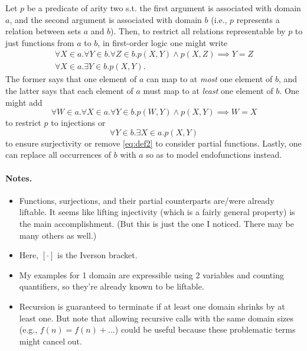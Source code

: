Let $p$ be a predicate of arity two s.t. the first argument is associated with domain $a$, and the second argument is associated with domain $b$ (i.e., $p$ represents a relation between sets $a$ and $b$). Then, to restrict all relations representable by $p$ to just functions from $a$ to $b$, in first-order logic one might write
\begin{gather}
  \forall X \in a. \forall Y \in b. \forall Z \in b. p(X, Y) \land p(X, Z) \implies Y = Z \label{eq:def1} \\
  \forall X \in a. \exists Y \in b. p(X, Y). \label{eq:def2}
\end{gather}
The former says that one element of $a$ can map to at \emph{most} one element of $b$, and the latter says that each element of $a$ must map to at \emph{least} one element of $b$. One might add
\begin{equation} \label{eq:injectivity}
  \forall W \in a. \forall X \in a. \forall Y \in b. p(W, Y) \land p(X, Y) \implies W = X
\end{equation}
to restrict $p$ to injections or
\begin{equation}
  \forall Y \in b. \exists X \in a. p(X, Y)
\end{equation}
to ensure surjectivity or remove \cref{eq:def2} to consider partial functions. Lastly, one can replace all occurrences of $b$ with $a$ so as to model endofunctions instead.

\paragraph{Notes.}
\begin{itemize}
\item Functions, surjections, and their partial counterparts are/were already liftable. It seems like lifting injectivity (which is a fairly general property) is the main accomplishment. (But this is just the one I noticed. There may be many others as well.)
\item Here, $[\cdot]$ is the Iverson bracket.
\item My examples for 1 domain are expressible using 2 variables and counting quantifiers, so they're already known to be liftable.
\item Recursion is guaranteed to terminate if at least one domain shrinks by at least one. But note that allowing recursive calls with the same domain sizes (e.g., $f(n) = f(n) + \dots$) could be useful because these problematic terms might cancel out.
\end{itemize}

